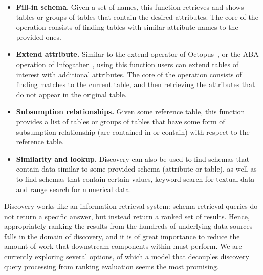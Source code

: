 \begin{itemize}
\item \textbf{Fill-in schema}. Given a set of names, this function retrieves and
shows tables or groups of tables that contain the desired attributes. The core
of the operation consists of finding tables with similar attribute names to the
provided ones.

\item \textbf{Extend attribute.} Similar to the extend operator of
Octopus~\cite{octopus}, or the ABA operation of
Infogather~\cite{DBLP:conf/sigmod/YakoutGCC12}, using this function users can
extend tables of interest with additional attributes. The core of the operation
consists of finding matches to the current table, and then retrieving the
attributes that do not appear in the original table.

\item \textbf{Subsumption relationships.} Given some reference table, this
function provides a list of tables or groups of tables that have some form of
subsumption relationship (\ie are contained in or contain) with respect to the
reference table. 

\item \textbf{Similarity and lookup.} Discovery can also be used to find schemas
that contain data similar to some provided schema (attribute or table), as well
as to find schemas that contain certain values, \ie keyword search for textual
data and range search for numerical data.  

\end{itemize}

Discovery works like an information retrieval system: schema retrieval
queries do not return a specific answer, but instead return a ranked set of
results. Hence, appropriately ranking the results from the hundreds of
underlying data sources falls in the domain of discovery, and it is of great
importance to reduce the amount of work that downstream components within \dcv
must perform. We are currently exploring several options, of which a model that
decouples discovery query processing from ranking evaluation seems the most
promising.


